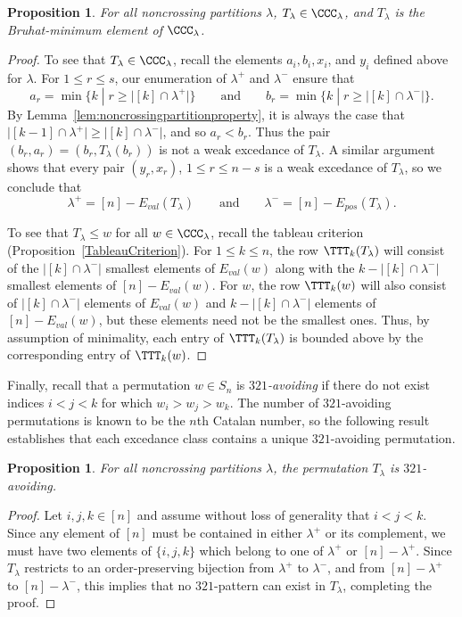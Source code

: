 \documentclass[12pt]{amsart}
\newtheorem{prop}[equation]{Proposition}
\theoremstyle{definition}
\theoremstyle{remark}
\numberwithin{equation}{section}
\renewcommand{\setminus}{-}
\newcommand{\EP}{E_{pos}}
\newcommand{\EV}{E_{val}}
\begin{document}
\begin{prop}
\label{prop:321avoid}
For all noncrossing partitions $\lambda$, $T_{\lambda} \in \CCC_{\lambda}$, and $T_{\lambda}$ is the Bruhat-minimum element of $\CCC_{\lambda}$.
\end{prop}
\begin{proof}
To see that $T_{\lambda} \in \CCC_{\lambda}$, recall the elements $a_{i}, b_{i}, x_{i}$, and $y_{i}$ defined above for $\lambda$. For $1 \le r \le s$, our enumeration of $\lambda^{+}$ and $\lambda^{-}$ ensure that
\[
a_{r} = \min\Big\{ k  \;|\;  r \ge \big|[k] \cap \lambda^{+}\big| \Big\}
\qquad\text{and}\qquad
b_{r} = \min\Big\{ k  \;|\;  r \ge \big|[k] \cap \lambda^{-}\big| \Big\}.
\]
By Lemma~\ref{lem:noncrossingpartitionproperty}, it is always the case that $\big|[k-1] \cap \lambda^{+}\big| \ge \big|[k] \cap \lambda^{-}\big|$, and so $a_{r} < b_{r}$.  Thus the pair $(b_{r}, a_{r}) = (b_{r}, T_{\lambda}(b_{r}))$ is not a weak excedance of $T_{\lambda}$.  
A similar argument shows that every pair $(y_{r}, x_{r})$, $1 \le r \le n-s$ is a weak excedance of $T_{\lambda}$, so we conclude that
\[
\lambda^{+} = [n] \setminus \EV(T_{\lambda})
\qquad\text{and}\qquad
\lambda^{-} =  [n] \setminus \EP(T_{\lambda}).
\]

To see that $T_{\lambda} \le w$ for all $w \in \CCC_{\lambda}$, recall the tableau criterion (Proposition~\ref{TableauCriterion}).  
For $1 \le k \le n$, the row $\TTT_{k}(T_{\lambda})$ will consist of the $\big|[k] \cap \lambda^{-}\big|$ smallest elements of $\EV(w)$ along with the $k - |[k] \cap \lambda^{-}|$ smallest elements of $[n] \setminus \EV(w)$.  
For $w$,  the row $\TTT_{k}(w)$ will also consist of $|[k] \cap \lambda^{-}|$ elements of $\EV(w)$ and $k - |[k] \cap \lambda^{-}|$ elements of $[n] \setminus \EV(w)$, but these elements need not be the smallest ones.  
Thus, by assumption of minimality, each entry of $\TTT_{k}(T_{\lambda})$ is bounded above by the corresponding entry of $\TTT_{k}(w)$.
\end{proof}

Finally, recall that a permutation $w \in S_{n}$ is \emph{$321$-avoiding} if there do not exist indices $i < j < k$ for which $w_{i} > w_{j} > w_{k}$.  The number of $321$-avoiding permutations is known to be the $n$th Catalan number, so the following result establishes that each excedance class contains a unique $321$-avoiding permutation.

\begin{prop}
\label{prop:Tlambda321}
For all noncrossing partitions $\lambda$, the permutation $T_{\lambda}$ is $321$-avoiding.
\end{prop}
\begin{proof}
Let $i, j, k\in [n]$ and assume without loss of generality that $i < j < k$.  Since any element of $[n]$ must be contained in either $\lambda^{+}$ or its complement, we must have two elements of $\{i, j, k\}$ which belong to one of $\lambda^{+}$ or $[n] \setminus \lambda^{+}$.  Since $T_{\lambda}$ restricts to an order-preserving bijection from $\lambda^{+}$ to $\lambda^{-}$, and from $[n] \setminus \lambda^{+}$ to $[n] \setminus \lambda^{-}$, this implies that no $321$-pattern can exist in $T_{\lambda}$, completing the proof.
\end{proof}
\end{document}
